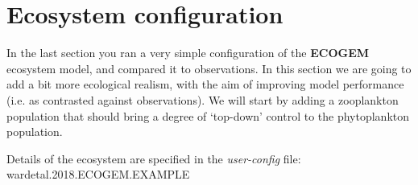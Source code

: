 \documentclass[11pt,fleqn]{book} %
\begin{document}
\noindent 


\newpage


\section{Ecosystem configuration}

In the last section you ran a very simple configuration of the \textbf{ECOGEM} ecosystem model, and compared it to observations. In this section we are going to add a bit more ecological realism, with the aim of improving model performance (i.e. as contrasted against observations). We will start by adding a zooplankton population that  should bring a degree of `top-down' control to the phytoplankton population.
\vspace{2mm}

Details of the ecosystem are specified in the \textit{user-config} file: \textsf{\footnotesize wardetal.2018.ECOGEM.EXAMPLE}
\end{document}
